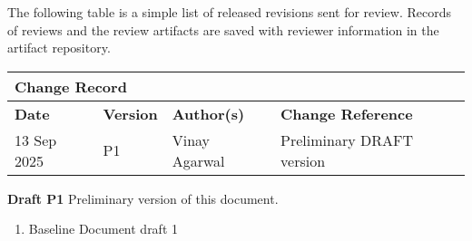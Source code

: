 
The following table is a simple list of released revisions sent for review.
Records of reviews and the review artifacts are saved with reviewer information in the \KNEADagencyName artifact repository.

\begin{table}[h]
	\centering 
		\begin{tabular}{|p{1.0in}|p{0.8in}|p{1.4in}|p{2.1in}|}
    \multicolumn{4}{l}{\bfseries Change Record} \\
		\hline
			{\bfseries Date}  &  {\bfseries Version} & {\bfseries Author(s)} & {\bfseries Change Reference} \\
		\hline
		\hline
			 13 Sep 2025	&	\centering	P1	&	{\raggedright Vinay Agarwal}	&	Preliminary DRAFT version  \\ \hline
		\hline		
		\hline				
  	\end{tabular}
\end{table}




{\bf Draft P1}
Preliminary version of this document.

\begin{enumerate}[itemindent=5pt,topsep=0pt,itemsep=0pt,partopsep=0pt, parsep=0pt]
	\item Baseline Document draft 1           
\end{enumerate}


